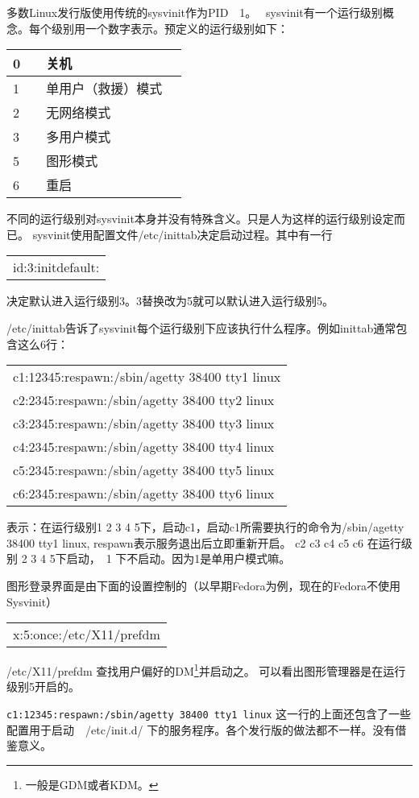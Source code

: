 \documentclass[amstex,twoside]{ctexbook}
\newenvironment{code}{\small\tt\begin{longtable}{p{0.8\textwidth}}}{\end{longtable}}
\begin{document}
多数Linux发行版使用传统的sysvinit作为PID　1。　
sysvinit有一个运行级别概念。每个级别用一个数字表示。预定义的运行级别如下：

\begin{longtable}{|l|p{}|}\hline
0　& 关机\\\hline
1 & 单用户（救援）模式　\\\hline
2 & 无网络模式　\\\hline
3 & 多用户模式　\\\hline
5 & 图形模式　\\\hline
6 & 重启　\\\hline
\end{longtable}

不同的运行级别对sysvinit本身并没有特殊含义。只是人为这样的运行级别设定而已。
sysvinit使用配置文件/etc/inittab决定启动过程。其中有一行
\begin{code}
id:3:initdefault:
\end{code}
决定默认进入运行级别3。3替换改为5就可以默认进入运行级别5。

/etc/inittab告诉了sysvinit每个运行级别下应该执行什么程序。例如inittab通常包含这么6行：
\begin{code}
c1:12345:respawn:/sbin/agetty 38400 tty1 linux\\
c2:2345:respawn:/sbin/agetty 38400 tty2 linux\\
c3:2345:respawn:/sbin/agetty 38400 tty3 linux\\
c4:2345:respawn:/sbin/agetty 38400 tty4 linux\\
c5:2345:respawn:/sbin/agetty 38400 tty5 linux\\
c6:2345:respawn:/sbin/agetty 38400 tty6 linux
\end{code}

表示：在运行级别1 2 3 4 5下，启动c1，启动c1所需要执行的命令为/sbin/agetty 38400 tty1 linux, respawn表示服务退出后立即重新开启。
c2 c3 c4 c5 c6 在运行级别 2 3 4 5下启动，　1 下不启动。因为1是单用户模式嘛。

图形登录界面是由下面的设置控制的（以早期Fedora为例，现在的Fedora不使用Sysvinit）
\begin{code}
x:5:once:/etc/X11/prefdm 
\end{code}
/etc/X11/prefdm 查找用户偏好的DM\footnote{一般是GDM或者KDM。}并启动之。
可以看出图形管理器是在运行级别5开启的。


{\tt c1:12345:respawn:/sbin/agetty 38400 tty1 linux} 这一行的上面还包含了一些配置用于启动　/etc/init.d/ 下的服务程序。各个发行版的做法都不一样。没有借鉴意义。
\end{document}

